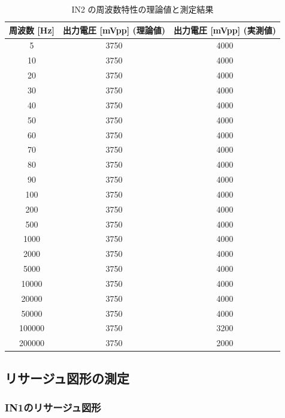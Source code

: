 \documentclass{jlreq}
\numberwithin{equation}{section}
\begin{document}
\begin{table}[H]
  \centering
  \caption{IN2 の周波数特性の理論値と測定結果}
  \begin{tabular}{|c|c|c|}
    \hline
    周波数 [Hz] & 出力電圧 [mVpp] (理論値) & 出力電圧 [mVpp] (実測値) \\ \hline
    5 & 3750 & 4000 \\ \hline
    10 & 3750 & 4000\\ \hline
    20 & 3750 & 4000 \\ \hline
    30 & 3750 & 4000 \\ \hline
    40 & 3750 & 4000 \\ \hline
    50 & 3750 & 4000 \\ \hline
    60 & 3750 & 4000 \\ \hline
    70 & 3750 & 4000 \\ \hline
    80 & 3750 & 4000 \\ \hline
    90 & 3750 & 4000 \\ \hline
    100 & 3750 & 4000 \\ \hline
    200 & 3750 & 4000 \\ \hline
    500 & 3750 & 4000 \\ \hline
    1000 & 3750 & 4000 \\ \hline
    2000 & 3750 & 4000 \\ \hline
    5000 & 3750 & 4000 \\ \hline
    10000 & 3750 & 4000 \\ \hline
    20000 & 3750 & 4000 \\ \hline
    50000 & 3750 & 4000 \\ \hline
    100000 & 3750 & 3200 \\ \hline
    200000 & 3750 & 2000 \\ \hline
  \end{tabular}
\end{table}


\subsection{リサージュ図形の測定}
\subsubsection{IN1のリサージュ図形}
\end{document}
